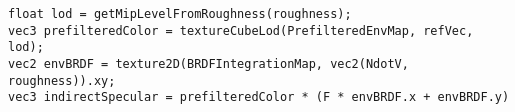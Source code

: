         \singlespacing
        \begin{lstlisting}[caption=C\'alculo de la componente especular debida al entorno]
float lod = getMipLevelFromRoughness(roughness);
vec3 prefilteredColor = textureCubeLod(PrefilteredEnvMap, refVec, lod);
vec2 envBRDF = texture2D(BRDFIntegrationMap, vec2(NdotV, roughness)).xy;
vec3 indirectSpecular = prefilteredColor * (F * envBRDF.x + envBRDF.y) 
        \end{lstlisting}
        \singlespacing
        




    


